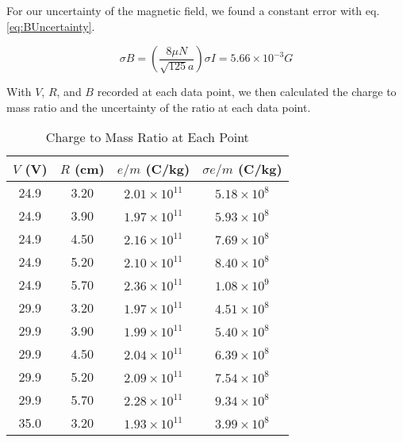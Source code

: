 \documentclass[journal, a4paper]{IEEEtran}
\begin{document}
	For our uncertainty of the magnetic field, we found a constant error with eq. \ref{eq:BUncertainty}.
    
      \begin{equation} \label{eq:BUncertainty} %
\sigma B=(\frac{8\mu N}{\sqrt{125}a})\sigma I = 5.66 \times 10^{-3} G
\end{equation}

	With $V$, $R$, and $B$ recorded at each data point, we then calculated the charge to mass ratio and the uncertainty of the ratio at each data point.
    
    \begin{table}[!hbt]
		\begin{center}
		\caption{Charge to Mass Ratio at Each Point}
		\label{tab:emRatio}
		\begin{tabular}{|c|c|c|c|}
			\hline
			$V$ (V) & $R$ (cm) & $e/m$ (C/kg) & $\sigma e/m$ (C/kg) \\
			\hline
			24.9 & 3.20 & $2.01 \times 10^{11}$ & $5.18 \times 10^8$\\
			\hline
			24.9 & 3.90 & $1.97 \times 10^{11}$ & $5.93 \times 10^8$\\
			\hline
			24.9 & 4.50 & $2.16 \times 10^{11}$ & $7.69 \times 10^8$\\
			\hline
            24.9 & 5.20 & $2.10 \times 10^{11}$ & $8.40 \times 10^8$\\
            \hline 
            24.9 & 5.70 & $2.36 \times 10^{11}$ & $1.08 \times 10^9$\\
            \hline
            29.9 & 3.20 & $1.97 \times 10^{11}$ & $4.51 \times 10^8$\\
            \hline
            29.9 & 3.90 & $1.99 \times 10^{11}$ & $5.40 \times 10^8$\\
            \hline
            29.9 & 4.50 & $2.04 \times 10^{11}$ & $6.39 \times 10^8$\\
            \hline
            29.9 & 5.20 & $2.09 \times 10^{11}$ & $7.54 \times 10^8$\\
            \hline
            29.9 & 5.70 & $2.28 \times 10^{11}$ & $9.34 \times 10^8$\\
            \hline
            35.0 & 3.20 & $1.93 \times 10^{11}$ & $3.99 \times 10^8$\\

\end{tabular}
\end{center}
\end{table}
\end{document}
